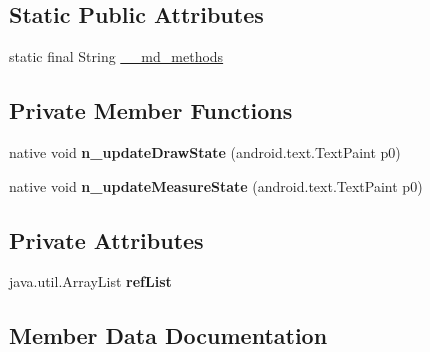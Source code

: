 \subsection*{Static Public Attributes}
\begin{DoxyCompactItemize}
\item 
static final String \hyperlink{classmd5b60ffeb829f638581ab2bb9b1a7f4f3f_1_1FormattedStringExtensions__FontSpan_a9dd575283d39b7b83571ef7dbbde9f63}{\+\_\+\+\_\+md\+\_\+methods}
\end{DoxyCompactItemize}
\subsection*{Private Member Functions}
\begin{DoxyCompactItemize}
\item 
\mbox{\label{classmd5b60ffeb829f638581ab2bb9b1a7f4f3f_1_1FormattedStringExtensions__FontSpan_ab56b8a213410eeb2ba105a8554b4f74b}} 
native void {\bfseries n\+\_\+update\+Draw\+State} (android.\+text.\+Text\+Paint p0)
\item 
\mbox{\label{classmd5b60ffeb829f638581ab2bb9b1a7f4f3f_1_1FormattedStringExtensions__FontSpan_a2ba128c6be5e9ce8349de20fbdb04e82}} 
native void {\bfseries n\+\_\+update\+Measure\+State} (android.\+text.\+Text\+Paint p0)
\end{DoxyCompactItemize}
\subsection*{Private Attributes}
\begin{DoxyCompactItemize}
\item 
\mbox{\label{classmd5b60ffeb829f638581ab2bb9b1a7f4f3f_1_1FormattedStringExtensions__FontSpan_aa9f3fdfef1b14e27e24108ef098a9091}} 
java.\+util.\+Array\+List {\bfseries ref\+List}
\end{DoxyCompactItemize}


\subsection{Member Data Documentation}
\mbox{\label{classmd5b60ffeb829f638581ab2bb9b1a7f4f3f_1_1FormattedStringExtensions__FontSpan_a9dd575283d39b7b83571ef7dbbde9f63}} 
